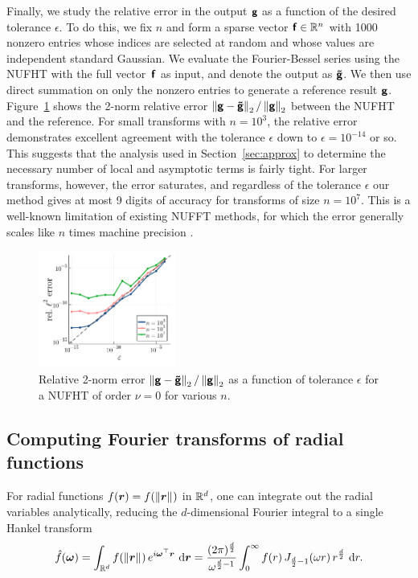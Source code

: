 Finally, we study the relative error in the output $\vct{g}$ as a function of
the desired tolerance $\epsilon$. To do this, we fix $n$ and form a sparse
vector $\vct{f} \in \R^n$ with 1000 nonzero entries whose indices are selected
at random and whose values are independent standard Gaussian. We evaluate the
Fourier-Bessel series using the NUFHT with the full vector~$\vct{f}$ as input,
and denote the output as $\vct{\tilde{g}}$. We then use direct summation on only
the nonzero entries to generate a reference result $\vct{g}$.
Figure~\ref{fig:accuracy} shows the 2-norm relative error $\norm[2]{\vct{g} -
\vct{\tilde{g}}} / \norm[2]{\vct{g}}$ between the NUFHT and the reference. For
small transforms with $n=10^3$, the relative error demonstrates excellent
agreement with the tolerance $\epsilon$ down to $\epsilon = 10^{-14}$ or so.
This suggests that the analysis used in Section~\ref{sec:approx} to determine
the necessary number of local and asymptotic terms is fairly tight. For larger
transforms, however, the error saturates, and regardless of the tolerance
$\epsilon$ our method gives at most 9 digits of accuracy for transforms of size
$n=10^7$. This is a well-known limitation of existing NUFFT methods, for which
the error generally scales like $n$ times machine precision \cite[Remark
9]{barnett2019parallel}.

\begin{figure}[t]
  \hspace*{0.25\textwidth}
  \includegraphics[width=0.4\textwidth]{./figures/accuracy.pdf}
  \caption{Relative 2-norm error $\norm[2]{\vct{g} - \vct{\tilde{g}}} /
  \norm[2]{\vct{g}}$ as a function of tolerance $\epsilon$ for a NUFHT of order
  $\nu=0$ for various $n$.}
  \label{fig:accuracy}
\end{figure}

\subsection{Computing Fourier transforms of radial functions}

For radial functions $f(\bm{r}) = f(\norm{\bm{r}})$ in $\R^d$, one can integrate
out the radial variables analytically, reducing the $d$-dimensional Fourier
integral to a single Hankel transform
\begin{align} \label{eq:radial-fourier}
    \hat{f}(\bm{\omega}) 
    = \int_{\R^d} f(\norm{\bm{r}}) \, e^{i\bm{\omega}^\top \bm{r}} \, \dif{\bm{r}}
    = \frac{(2\pi)^{\frac{d}{2}}}{\omega^{\frac{d}{2} - 1}} \int_0^\infty f(r)
  \, J_{\frac{d}{2} - 1}(\omega r) \, r^{\frac{d}{2}} \, \dif{r}.
\end{align}

